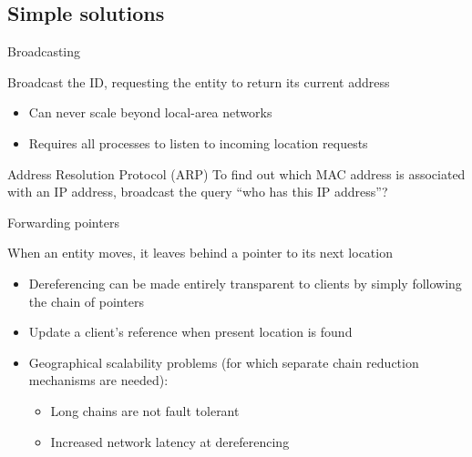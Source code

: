 \subsection{Simple solutions}
\begin{slide}{Broadcasting}
  \begin{block}{Broadcast the ID, requesting the entity to return its current address}
    \begin{itemize}\tightlist
    \item Can never scale beyond local-area networks
    \item Requires all processes to listen to incoming location requests
    \end{itemize}
  \end{block}
  \begin{exampleblock}{Address Resolution Protocol (ARP)}
    To find out which MAC address is associated with an IP address, broadcast the query ``who has this IP
    address''?
  \end{exampleblock}
\end{slide}
\begin{slide}{Forwarding pointers}
  \begin{block}{When an entity moves, it leaves behind a pointer to its next location}
    \begin{itemize}
    \item Dereferencing can be made entirely transparent to clients by simply following the chain of pointers
    \item Update a client's reference when present location is found
    \item Geographical scalability problems (for which separate chain reduction mechanisms are needed):
      \begin{itemize}\tightlist
      \item Long chains are not fault tolerant
      \item Increased network latency at dereferencing
      \end{itemize}
    \end{itemize}
  \end{block}
\end{slide}
